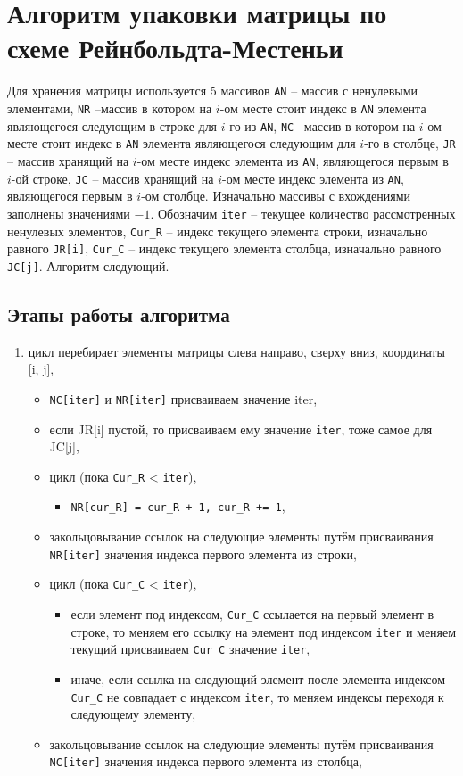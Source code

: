 \section{Алгоритм упаковки матрицы по схеме Рейнбольдта-Местеньи}
Для хранения матрицы используется 5 массивов \texttt{AN} -- массив с ненулевыми элементами, \texttt{NR} --массив в котором на $i$-ом месте стоит индекс в \texttt{AN} элемента являющегося следующим в строке для $i$-го из \texttt{AN}, \texttt{NC} --массив в котором на $i$-ом месте стоит индекс в \texttt{AN} элемента являющегося следующим для $i$-го в столбце, \texttt{JR} -- массив хранящий на $i$-ом месте индекс элемента из \texttt{AN}, являющегося первым в $i$-ой строке, \texttt{JС} -- массив хранящий на $i$-ом месте индекс элемента из \texttt{AN}, являющегося первым в $i$-ом столбце. Изначально массивы с вхождениями заполнены значениями $-1$. Обозначим \texttt{iter} -- текущее количество рассмотренных ненулевых элементов, \texttt{Cur\_R} -- индекс текущего элемента строки, изначально равного \texttt{JR[i]}, \texttt{Cur\_C} -- индекс текущего элемента столбца, изначально равного \texttt{JC[j]}. Алгоритм следующий.
\subsection*{Этапы работы алгоритма}
\begin{enumerate}
	\item цикл перебирает элементы матрицы слева направо, сверху вниз, координаты [i, j],
	\begin{itemize}
		\item \texttt{NC[iter]} и \texttt{NR[iter]} присваиваем значение iter,
		\item если JR[i] пустой, то присваиваем ему значение \texttt{iter}, тоже самое для JC[j],
		\item цикл (пока \texttt{Cur\_R} < \texttt{iter}),
		\begin{itemize}
			\item \texttt{NR[cur\_R] = cur\_R + 1, cur\_R += 1},
		\end{itemize}
		\item закольцовывание ссылок на следующие элементы путём присваивания \texttt{NR[iter]} значения индекса первого элемента из строки,
		
		\item цикл (пока \texttt{Cur\_C} < \texttt{iter}),
		\begin{itemize}
			\item если элемент под индексом, \texttt{Cur\_C} ссылается на первый элемент в строке, то меняем его ссылку на элемент под индексом \texttt{iter} и меняем текущий присваиваем \texttt{Cur\_C} значение \texttt{iter},
		    \item иначе, если ссылка на следующий элемент после элемента индексом \texttt{Cur\_C} не совпадает с индексом \texttt{iter}, то меняем индексы переходя к следующему элементу,
			\end{itemize}
		\item закольцовывание ссылок на следующие элементы путём присваивания \texttt{NC[iter]} значения индекса первого элемента из столбца,
	\end{itemize}
\end{enumerate}

